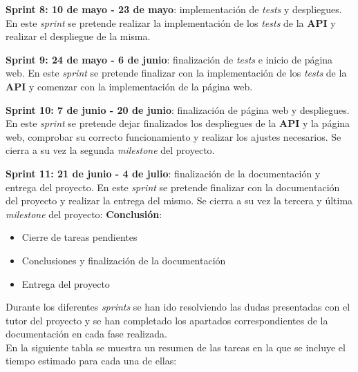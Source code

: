 \textbf{Sprint 8: 10 de mayo - 23 de mayo}: implementación de \textit{tests} y despliegues. En este \textit{sprint}
se pretende realizar la implementación de los \textit{tests} de la \textbf{API} y realizar el despliegue de la misma.

\textbf{Sprint 9: 24 de mayo - 6 de junio}: finalización de \textit{tests} e inicio de página web. En este \textit{sprint}
se pretende finalizar con la implementación de los \textit{tests} de la \textbf{API} y comenzar con la implementación de la página web.

\textbf{Sprint 10: 7 de junio - 20 de junio}: finalización de página web y despliegues. En este \textit{sprint} se pretende
dejar finalizados los despliegues de la \textbf{API} y la página web, comprobar su correcto funcionamiento y realizar los ajustes
necesarios. Se cierra a su vez la segunda \textit{milestone} del proyecto.

\textbf{Sprint 11: 21 de junio - 4 de julio}: finalización de la documentación y entrega del proyecto. En este \textit{sprint} se
pretende finalizar con la documentación del proyecto y realizar la entrega del mismo. Se cierra a su vez la tercera y
última \textit{milestone} del proyecto: \textbf{Conclusión}:

\begin{itemize}
    \item Cierre de tareas pendientes
    \item Conclusiones y finalización de la documentación
    \item Entrega del proyecto
\end{itemize}

\newpage

Durante los diferentes \textit{sprints} se han ido resolviendo las dudas presentadas con el tutor del proyecto
y se han completado los apartados correspondientes de la documentación en cada fase realizada. \\

En la siguiente tabla se muestra un resumen de las tareas en la
que se incluye el tiempo estimado para cada una de ellas:

